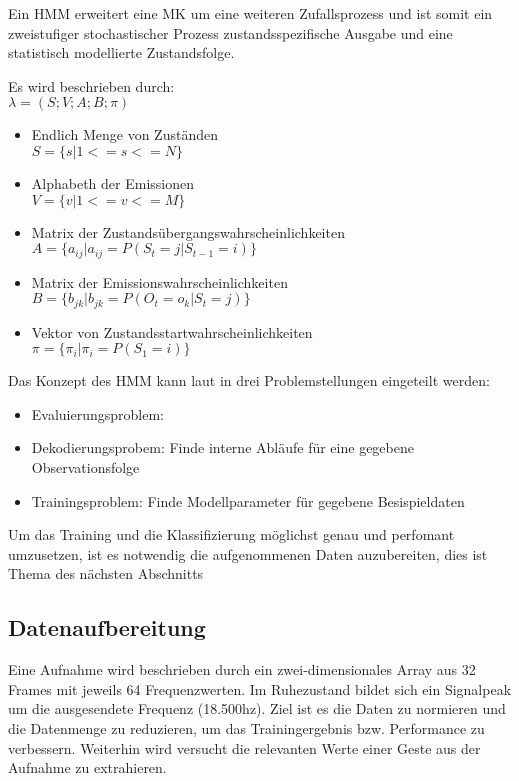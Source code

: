Ein \acl{HMM} erweitert eine \acl{MK} um eine weiteren Zufallsprozess und ist somit ein zweistufiger stochastischer Prozess \cite[67]{mmmFink}
zustandsspezifische Ausgabe und eine statistisch modellierte Zustandsfolge. 


Es wird beschrieben durch:\\ 
\( \lambda = (S;V;A;B;\pi)\)
\begin{itemize}
     \item Endlich Menge von Zuständen \\
           \( S = \{ s | 1 <= s <= N \} \)
     \item Alphabeth der Emissionen \\
           \( V = \{ v | 1 <= v <= M \} \)
     \item Matrix der Zustandsübergangswahrscheinlichkeiten \\
           \( A = \{ a_{ij} | a_{ij} = P(S_t = j | S_{t-1} = i) \} \)
     \item Matrix der Emissionswahrscheinlichkeiten \\
           \( B = \{ b_{jk} | b_{jk} = P(O_t = o_k | S_t = j) \} \)
     \item Vektor von Zustandsstartwahrscheinlichkeiten \\
           \( \pi = \{ \pi_i | \pi_i = P(S_1 = i) \} \) 
\end{itemize}

Das Konzept des \acl{HMM} kann laut \cite{rabiner} in drei Problemstellungen eingeteilt werden:
\begin{itemize}
  \item Evaluierungsproblem: 
  \item Dekodierungsprobem: Finde interne Abläufe für eine gegebene Observationsfolge
  \item Trainingsproblem: Finde Modellparameter für gegebene Besispieldaten
\end{itemize}




Um das Training und die Klassifizierung möglichst genau und perfomant umzusetzen, 
ist es notwendig die aufgenommenen Daten auzubereiten, dies ist Thema des nächsten Abschnitts


\subsection{Datenaufbereitung} \label{sec:preproc}
Eine Aufnahme wird beschrieben durch ein zwei-dimensionales Array aus 32 Frames mit jeweils 64 Frequenzwerten.
Im Ruhezustand bildet sich ein Signalpeak um die ausgesendete Frequenz (18.500hz).
Ziel ist es die Daten zu normieren und die Datenmenge zu reduzieren, um das Trainingergebnis bzw. Performance zu verbessern.
Weiterhin wird versucht die relevanten Werte einer Geste aus der Aufnahme zu extrahieren.

